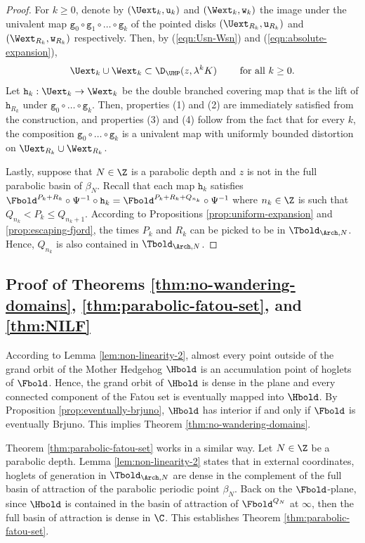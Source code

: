 \documentclass{amsart}
\begin{document}
\begin{proof}
    For $k \geq 0$, denote by $(\Uext_k, \mathtt{u}_k)$ and $(\Wext_k, \mathtt{w}_k)$ the image under the univalent map $\mathtt{g}_0 \circ \mathtt{g}_1 \circ \ldots \circ \mathtt{g}_k$ of the pointed disks $(\Uext_{R_k}, \mathtt{u}_{R_k})$ and $(\Wext_{R_k}, \mathtt{w}_{R_k})$ respectively.
    Then, by (\ref{eqn:Usn-Wsn}) and (\ref{eqn:absolute-expansion}),
    \[
        \Uext_k \cup \Wext_k \subset \D_{\UHP}( z, \lambda^k K )
        \qquad \textnormal{ for all } k \geq 0.
    \]
    Let $\mathtt{h}_k: \Uext_k \to \Wext_k$ be the double branched covering map that is the lift of $\mathtt{h}_{R_k}$ under $\mathtt{g}_0 \circ \ldots \circ \mathtt{g}_k$.
    Then, properties (1) and (2) are immediately satisfied from the construction, and properties (3) and (4) follow from the fact that for every $k$, the composition $\mathtt{g}_0 \circ \ldots \circ \mathtt{g}_k$ is a univalent map with uniformly bounded distortion on $\Uext_{R_k} \cup \Wext_{R_k}$.

    Lastly, suppose that $N \in \Z$ is a parabolic depth and $z$ is not in the full parabolic basin of $\beta_N$.
    Recall that each map $\mathtt{h}_k$ satisfies $\Fbold^{P_k + R_k} \circ \Psi^{-1} \circ \mathtt{h}_k = \Fbold^{P_k + R_k + Q_{n_k}} \circ \Psi^{-1}$ where $n_k \in \Z$ is such that $Q_{n_k} < P_k \leq Q_{n_k+1}$.
    According to Propositions \ref{prop:uniform-expansion} and \ref{prop:escaping-fjord}, the times $P_k$ and $R_k$ can be picked to be in $\Tbold_{\Arch,N}$.
    Hence, $Q_{n_k}$ is also contained in $\Tbold_{\Arch,N}$.
\end{proof}

\subsection{Proof of Theorems \ref{thm:no-wandering-domains}, \ref{thm:parabolic-fatou-set}, and \ref{thm:NILF}}
\label{ss:proof-3-theorems}

According to Lemma \ref{lem:non-linearity-2}, almost every point outside of the grand orbit of the Mother Hedgehog $\Hbold$ is an accumulation point of hoglets of $\Fbold$. 
Hence, the grand orbit of $\Hbold$ is dense in the plane and every connected component of the Fatou set is eventually mapped into $\Hbold$.
By Proposition \ref{prop:eventually-brjuno}, $\Hbold$ has interior if and only if $\Fbold$ is eventually Brjuno. 
This implies Theorem \ref{thm:no-wandering-domains}.

Theorem \ref{thm:parabolic-fatou-set} works in a similar way. Let $N \in \Z$ be a parabolic depth. 
Lemma \ref{lem:non-linearity-2} states that in external coordinates, hoglets of generation in $\Tbold_{\Arch,N}$ are dense in the complement of the full basin of attraction of the parabolic periodic point $\beta_N$.
Back on the $\Fbold$-plane, since $\Hbold$ is contained in the basin of attraction of $\Fbold^{Q_N}$ at $\infty$, then the full basin of attraction is dense in $\C$.
This establishes Theorem \ref{thm:parabolic-fatou-set}.
\end{document}
